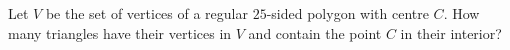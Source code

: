Let $V$ be the set of vertices of a regular $25$-sided polygon with centre $C$. How many triangles have their vertices in $V$ and contain the point $C$ in their interior?
